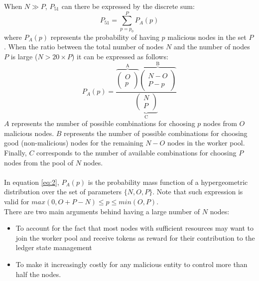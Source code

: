 When $N \gg P$, $P_{51}$ can there be expressed by the discrete sum:
\begin{equation}
\label{eq:1}
P_{51} = \sum_{p=p_0}^{P} P_{A}(p)
\end{equation}
where $P_{A}(p)$ represents the probability of having $p$ malicious nodes in the set $P$. When the ratio between the total number of nodes $N$ and the number of nodes $P$ is large ($N > 20\times P$) it can be expressed as follows: 
\begin{equation}
\label{eq:2}
P_{A}(p) = \frac{\overbrace{\left( \begin{array}{c} O \\
p \end{array} \right)}^\text{A} 
\overbrace{\left( \begin{array}{c} N - O \\ P - p \end{array} \right)}^\text{B}}{\underbrace{\left( \begin{array}{c} N \\
P \end{array} \right)}_\text{C}}
\end{equation}
$A$ represents the number of possible combinations for choosing $p$ nodes from $O$ malicious nodes. $B$ represents the number of possible combinations for choosing good (non-malicious) nodes for the remaining $N-O$ nodes in the worker pool. Finally, $C$ corresponds to the number of available combinations for choosing $P$ nodes from the pool of $N$ nodes.\\
\\
In equation \ref{eq:2}, $P_A(p)$ is the probability mass function of a hypergeometric distribution over the set of parameters $\{N,O,P\}$. Note that such expression is valid for $max(0,O+P-N) \leq p \leq min(O,P)$. \\

There are two main arguments behind having a large number of $N$ nodes:

\begin{itemize}
 \item To account for the fact that most nodes with sufficient resources may want to join the worker pool and receive tokens as reward for their contribution to the ledger state management
\item To make it increasingly costly for any malicious entity to control more than half the nodes.
\end{itemize}

